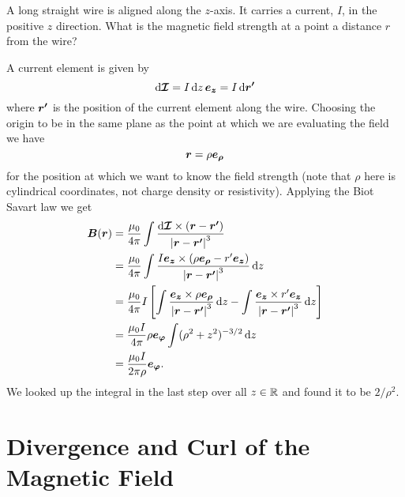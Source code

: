     \begin{example}
        A long straight wire is aligned along the \(z\)-axis.
        It carries a current, \(I\), in the positive \(z\) direction.
        What is the magnetic field strength at a point a distance \(r\) from the wire?
        
        A current element is given by
        \[\dd{\bm{\mathcal{I}}} = I\dd{z}\bm{e_{z}} = I\dd{\bm{r'}}\]
        where \(\bm{r'}\) is the position of the current element along the wire.
        Choosing the origin to be in the same plane as the point at which we are evaluating the field we have
        \[\bm{r} = \rho\bm{e_{\rho}}\]
        for the position at which we want to know the field strength (note that \(\rho\) here is cylindrical coordinates, not charge density or resistivity).
        Applying the Biot Savart law we get
        \begin{align*}
            \bm{B}(\bm{r}) &= \frac{\mu_0}{4\pi} \int \frac{\dd{\bm{\mathcal{I}}} \times (\bm{r} - \bm{r'})}{\abs{\bm{r} - \bm{r'}}^3}\\
            &= \frac{\mu_0}{4\pi} \int \frac{I\bm{e_{z}}\times(\rho\bm{e_{\rho}} - r'\bm{e_{z}})}{\abs{\bm{r} - \bm{r'}}^3} \dd{z}\\
            &= \frac{\mu_0}{4\pi} I \left[ \int \frac{\bm{e_{z}}\times\rho\bm{e_{\rho}}}{\abs{\bm{r} - \bm{r'}}^3} \dd{z} - \int \frac{\bm{e_{z}}\times r'\bm{e_{z}}}{\abs{\bm{r} - \bm{r'}}^3} \dd{z} \right]\\
            &= \frac{\mu_0 I}{4\pi}\rho\bm{e_{\varphi}}\int (\rho^2 + z^2)^{-3/2} \dd{z}\\
            &= \frac{\mu_0 I}{2\pi\rho}\bm{e_{\varphi}}.
        \end{align*}
        We looked up the integral in the last step over all \(z\in\mathbb{R}\) and found it to be \(2/\rho^2\).
    \end{example}

    \section{Divergence and Curl of the Magnetic Field}
